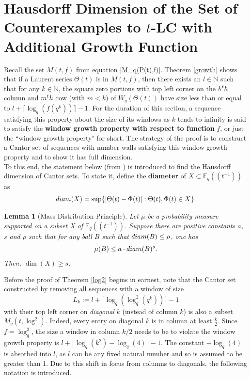 \documentclass{article}
\newtheorem{lemma}[theorem]{Lemma}
\theoremstyle{definition}
\newcommand{\diam}{\textup{diam}}
\newcommand{\nth}{\textup{th}}
\newcommand{\N}{\mathbb{N}}
\newcommand{\F}{\mathbb{F}}
\numberwithin{equation}{subsection}
\begin{document}
\section{Hausdorff Dimension of the Set of Counterexamples to $t$-LC with Additional Growth Function}\label{Sect:HD}

\noindent Recall the set $M(t,f)$ from equation \ref{M_q(P(t),f)}. Theorem \ref{growth} shows that if a Laurent series $\Theta(t)$ is in $M(t,f)$, then there exists an $l\in\N$ such that for any $k\in\N$, the square zero portions with top left corner on the $k^\nth$ column and $m^\nth$ row (with $m<k$) of  $W_q(\Theta(t))$ have size less than or equal to $l+\lceil \log_q(f(q^k))\rceil -1$. For the duration of this section, a sequence satisfying this property about the size of its windows as $k$ tends to infinity is said to satisfy the \textbf{window growth property with respect to function} $f$, or just the ``window growth property" for short. The strategy of the proof is to construct a Cantor set of sequences with number walls satisfying this window growth property and to show it has full dimension.\\

\noindent To this end, the statement below (from \cite[Lemma2]{HillVelani}) is introduced to find the Hausdorff dimension of Cantor sets. To state it, define the \textbf{diameter} of  $X\subset\F_q\!\left(\!\left(t^{-1}\right)\!\right)$ as \[\diam(X)=\sup\{|\Theta(t)-\Phi(t)|:\Theta(t),\Phi(t)\in X\}.\]
\begin{lemma}[Mass Distribution Principle]\label{MDP}
  Let $\mu$ be a probability measure supported on a subset X of $\F_q\!\left(\!\left(t^{-1}\right)\!\right)$. Suppose there are positive constants $a$, $s$ and $\rho$ such that for any ball $B$ such that $\diam(B)\le \rho$, one has\[\mu(B)\le a\cdot\diam(B)^s.\] Then, $\dim(X)\ge s$.
\end{lemma}

 \noindent Before the proof of Theorem \ref{log2} begins in earnest, note that the Cantor set constructed by removing all sequences with a window of size \begin{equation}L_k:=l+\lceil \log_q(\log^2_q(q^k))\rceil -1\label{L_k}\end{equation} with their top left corner on \textit{diagonal} $k$ (instead of column $k$) is also a subset $M_q(t,\log^2)$. Indeed, every entry on diagonal $k$ is in column at least $\frac{k}{2}$. Since $f=\log_q^2$, the size a window in column $k/2$ needs to be to violate the window growth property is $l+\lceil \log_q(k^2)-\log_q\left(4\right)\rceil-1$. The constant $-\log_q\left(4\right)$ is absorbed into $l$, as $l$ can be any fixed natural number and so is assumed to be greater than 1. Due to this shift in focus from columns to diagonals, the following notation is introduced.\\
 
\end{document}
